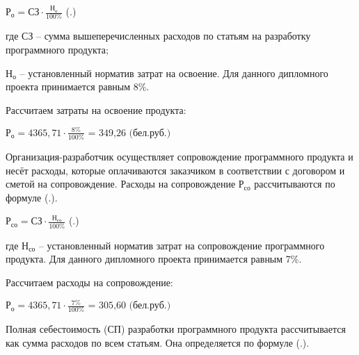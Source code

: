 {	\formulaspace \par \redline 
		$\textrm{Р}_{\textrm{о}} = \textrm{СЗ} \cdot \frac{\textrm{Н}_{\textrm{о}}}{\textrm{100\%}}$
	\hfill (\thechaptercntr .\theformulacntr) \redline
	\formulaspace \addtocounter{formulacntr}{1}

	\par \redline где $\textrm{СЗ}$ {--} сумма вышеперечисленных расходов по статьям на разработку программного продукта; 
	\par \redline \wherespace $\textrm{Н}_{\textrm{о}}$ {--} установленный норматив затрат на освоение. Для данного дипломного проекта принимается равным 8\%.

	\par \redline Рассчитаем затраты на освоение продукта:

	\formulaspace \par \redline 
		$\textrm{Р}_{\textrm{о}} = 4365,71 \cdot \frac{\textrm{8\%}}{\textrm{100\%}} \textrm{ = 349,26 (бел.руб.)}$
    \formulaspace 

	\par \redline Организация-разработчик осуществляет сопровождение программного продукта и несёт расходы, которые оплачиваются заказчиком в соответствии с договором и сметой на сопровождение. Расходы на сопровождение $\textrm{Р}_{\textrm{со}}$ рассчитываются по формуле (\thechaptercntr .\theformulacntr).

	\formulaspace \par \redline 
		$\textrm{Р}_{\textrm{со}} = \textrm{СЗ} \cdot \frac{\textrm{Н}_{\textrm{со}}}{\textrm{100\%}}$
	\hfill (\thechaptercntr .\theformulacntr) \redline
	\formulaspace \addtocounter{formulacntr}{1}

	\par \redline где $\textrm{Н}_{\textrm{со}}$ {--} установленный норматив затрат на сопровождение программного продукта. Для данного дипломного проекта принимается равным 7\%. 

	\par \redline Рассчитаем расходы на сопровождение:

	\formulaspace \par \redline 
		$\textrm{Р}_{\textrm{о}} = 4365,71 \cdot \frac{\textrm{7\%}}{\textrm{100\%}} \textrm{ = 305,60 (бел.руб.)}$
	\formulaspace 

	\par \redline Полная себестоимость (СП) разработки программного продукта рассчитывается как сумма расходов по всем статьям. Она определяется по формуле (\thechaptercntr .\theformulacntr).
	
}
